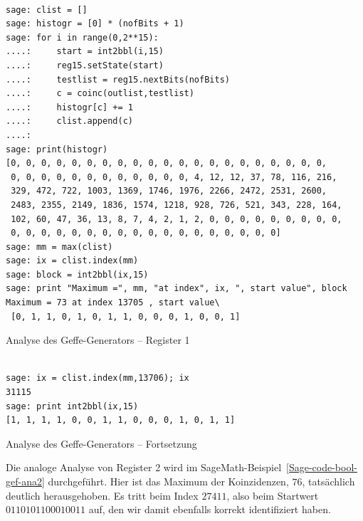 \begin{refsegment}
\begin{sagecode}
\begin{verbatim}

sage: clist = []
sage: histogr = [0] * (nofBits + 1)
sage: for i in range(0,2**15):
....:     start = int2bbl(i,15)
....:     reg15.setState(start)
....:     testlist = reg15.nextBits(nofBits)
....:     c = coinc(outlist,testlist)
....:     histogr[c] += 1
....:     clist.append(c)
....:
sage: print(histogr)
[0, 0, 0, 0, 0, 0, 0, 0, 0, 0, 0, 0, 0, 0, 0, 0, 0, 0, 0, 0, 0,
 0, 0, 0, 0, 0, 0, 0, 0, 0, 0, 0, 0, 4, 12, 12, 37, 78, 116, 216,
 329, 472, 722, 1003, 1369, 1746, 1976, 2266, 2472, 2531, 2600,
 2483, 2355, 2149, 1836, 1574, 1218, 928, 726, 521, 343, 228, 164,
 102, 60, 47, 36, 13, 8, 7, 4, 2, 1, 2, 0, 0, 0, 0, 0, 0, 0, 0, 0,
 0, 0, 0, 0, 0, 0, 0, 0, 0, 0, 0, 0, 0, 0, 0, 0, 0, 0]
sage: mm = max(clist)
sage: ix = clist.index(mm)
sage: block = int2bbl(ix,15)
sage: print "Maximum =", mm, "at index", ix, ", start value", block
Maximum = 73 at index 13705 , start value\
 [0, 1, 1, 0, 1, 0, 1, 1, 0, 0, 0, 1, 0, 0, 1]
\end{verbatim}
\caption{Analyse des Geffe-Generators -- Register 1}\label{Sage-code-bool-gef-ana1}
\end{sagecode}

\begin{sagecode}
\begin{verbatim}

sage: ix = clist.index(mm,13706); ix
31115
sage: print int2bbl(ix,15)
[1, 1, 1, 1, 0, 0, 1, 1, 0, 0, 0, 1, 0, 1, 1]
\end{verbatim}
\caption{Analyse des Geffe-Generators -- Fortsetzung}\label{Sage-code-bool-gef-ana1a}
\end{sagecode}
\clearpage

Die analoge Analyse von Register 2 wird im SageMath-Beispiel~\ref{Sage-code-bool-gef-ana2}
durchgeführt. Hier ist das Maximum der Koinzidenzen, $76$,
tatsächlich deutlich herausgehoben. Es tritt beim Index $27411$,
also beim Startwert $0110101100010011$ auf, den wir damit
ebenfalls korrekt identifiziert haben.

\begin{sagecode}
\begin{verbatim}


\end{verbatim}
\end{sagecode}
\end{refsegment}
